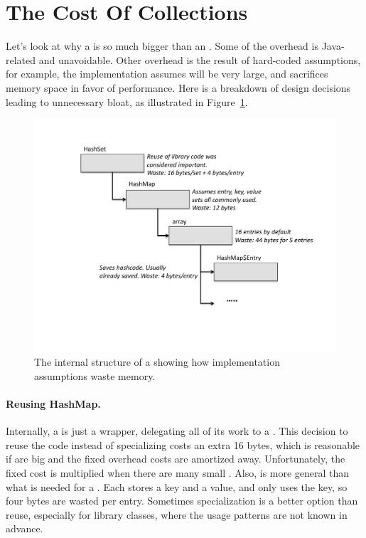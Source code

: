 \section{The Cost Of Collections}
\label{sec:collectioncost}
Let's look at why a  is so much bigger than an . 
Some of the  overhead is Java-related and
unavoidable. Other overhead is the result of hard-coded assumptions, for
example, the  implementation assumes  will be very large, 
and sacrifices memory space in favor of performance. 
Here is a breakdown of  design decisions leading to
unnecessary bloat, as illustrated in Figure~\ref{fig:hashset}.
 \begin{figure}
  \centering
 \includegraphics[width=.80\textwidth]{part1/Figures/collections/hashset.pdf}
  \caption{The internal structure of a  showing how
  implementation assumptions waste memory.}
  \label{fig:hashset}
\end{figure}

\paragraph{Reusing HashMap.} Internally, a  is just a wrapper,
delegating all of its work to a .
This decision to reuse the  code instead of specializing
 costs an extra 16 bytes, which is reasonable if
 are big and the fixed overhead costs are amortized away. 
Unfortunately, the fixed cost is multiplied when there are many
small . 
Also,  is more general than what is needed for a .
Each  stores a key and a
value, and  only uses the key, so four bytes are wasted per
entry. Sometimes specialization is a better option than reuse, especially for
library classes, where the usage patterns are not known in advance.
  
